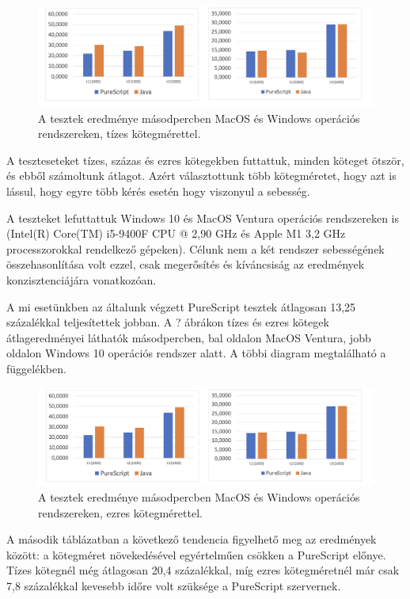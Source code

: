 \documentclass[12pt]{article}
\begin{document}
\begin{figure}[h!]
	\includegraphics[width=\textwidth]{diag10}
	\caption{A tesztek eredménye másodpercben MacOS és Windows operációs rendszereken, tízes kötegmérettel.}
\end{figure}

A teszteseteket tízes, százas és ezres kötegekben futtattuk, minden köteget ötször, és ebből számoltunk átlagot. Azért választottunk több kötegméretet, hogy azt is lássul, hogy egyre több kérés esetén hogy viszonyul a sebesség.

A teszteket lefuttattuk Windows 10 és MacOS Ventura operációs rendszereken is (Intel(R) Core(TM) i5-9400F CPU @ 2,90 GHz és Apple M1 3,2 GHz processzorokkal rendelkező gépeken). Célunk nem a két rendszer sebességének összehasonlítása volt ezzel, csak megerősítés és kíváncsiság az eredmények konzisztenciájára vonatkozóan.

A mi esetünkben az általunk végzett PureScript tesztek átlagosan 13,25 százalékkal teljesítettek jobban.  A ? ábrákon tízes és ezres kötegek átlageredményei láthatók másodpercben, bal oldalon MacOS Ventura, jobb oldalon Windows 10 operációs rendszer alatt. A többi diagram megtalálható a függelékben.

\begin{figure}[h!]
	\includegraphics[width=\textwidth]{diag1000}
	\caption{A tesztek eredménye másodpercben MacOS és Windows operációs rendszereken, ezres kötegmérettel.}
\end{figure}

A második táblázatban a következő tendencia figyelhető meg az eredmények között: a kötegméret növekedésével egyértelműen csökken a PureScript előnye. Tízes kötegnél még átlagosan 20,4 százalékkal, míg ezres kötegméretnél már csak 7,8 százalékkal kevesebb időre volt szüksége a PureScript szervernek.
\end{document}

